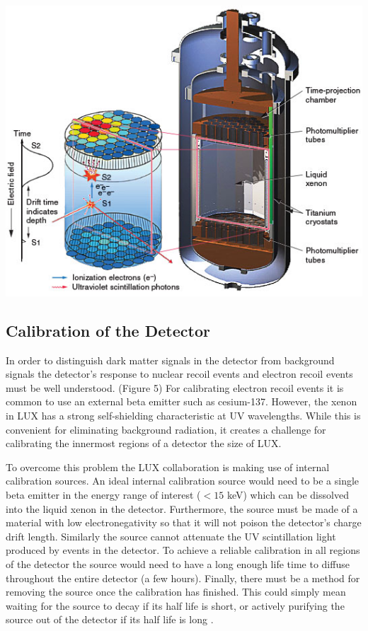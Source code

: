 \documentclass[a4paper,12pt]{article}
\begin{document}
\begin{center}
\includegraphics[scale=0.5]{lux.jpg}
\end{center}

\subsection{Calibration of the Detector}

In order to distinguish dark matter signals in the detector from background signals the detector's response to nuclear recoil events and electron recoil events must be well understood. (Figure 5) For calibrating electron recoil events it is common to use an external beta emitter such as cesium-137.  However, the xenon in LUX has a strong self-shielding characteristic at UV wavelengths.  While this is convenient for eliminating background radiation, it creates a challenge for calibrating the innermost regions of a detector the size of LUX.

To overcome this problem the LUX collaboration is making use of internal calibration sources.  An ideal internal calibration source would need to be a single beta emitter in the energy range of interest ($ <15 $ keV) which can be dissolved into the liquid xenon in the detector.  Furthermore, the source must be made of a material with low electronegativity so that it will not poison the detector's charge drift length.  Similarly the source cannot attenuate the UV scintillation light produced by events in the detector.  To achieve a reliable calibration in all regions of the detector the source would need to have a long enough life time to diffuse throughout the entire detector (a few hours).  Finally, there must be a method for removing the source once the calibration has finished.  This could simply mean waiting for the source to decay if its half life is short, or actively purifying the source out of the detector if its half life is long \cite{Kastens}.
\end{document}
